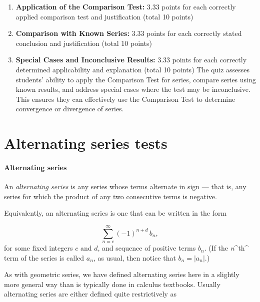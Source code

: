 \begin{enumerate}
    \item \textbf{Application of the Comparison Test:} 3.33 points for each correctly applied comparison test and justification (total 10 points)
    \item \textbf{Comparison with Known Series:} 3.33 points for each correctly stated conclusion and justification (total 10 points)
    \item \textbf{Special Cases and Inconclusive Results:} 3.33 points for each correctly determined applicability and explanation (total 10 points) The quiz assesses students' ability to apply the Comparison Test for series, compare series using known results, and address special cases where the test may be inconclusive. This ensures they can effectively use the Comparison Test to determine convergence or divergence of series.
\end{enumerate}

\section{Alternating series tests}
\label{sec:alternating-series-tests}

\paragraph{Alternating series}



An \textit{alternating series} is any series whose terms alternate in sign — that is, any series for which the product of any two consecutive terms is negative.



Equivalently, an alternating series is one that can be written in the form



$$\sum _{n=c}^\infty (-1)^{n+d}\, b _n,$$ for some fixed integers $c$ and $d$, and sequence of positive terms $b _n$. (If the \textit{n}^th^ term of the series is called $a _n$, as usual, then notice that $b _n=|a _n|$.)



As with geometric series, we have defined alternating series here in a slightly more general way than is typically done in calculus textbooks. Usually alternating series are either defined quite restrictively as



